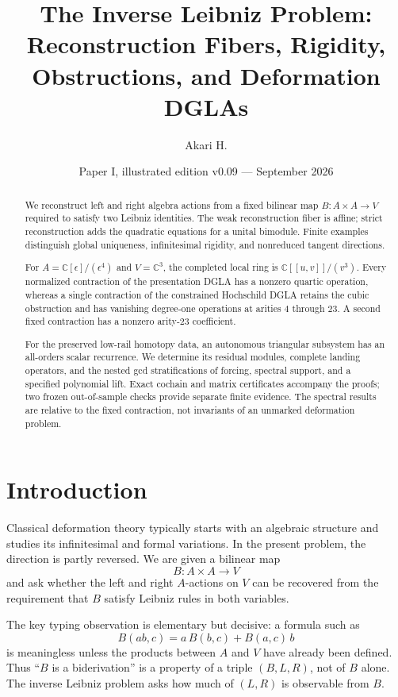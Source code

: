 \documentclass[11pt]{amsart}
\title[The Inverse Leibniz Problem]{The Inverse Leibniz Problem:\\Reconstruction Fibers, Rigidity, Obstructions, and Deformation DGLAs}
\author{Akari H.}
\date{Paper I, illustrated edition v0.09 --- September 2026}
\newcommand{\C}{\mathbb C}
\begin{document}
\begin{abstract}
We reconstruct left and right algebra actions from a fixed bilinear map
$B:A\times A\to V$ required to satisfy two Leibniz identities.
The weak reconstruction fiber is affine; strict reconstruction adds the
quadratic equations for a unital bimodule. Finite examples distinguish
global uniqueness, infinitesimal rigidity, and nonreduced tangent directions.

For $A=\C[\epsilon]/(\epsilon^4)$ and $V=\C^3$, the completed local ring is
$\C[[u,v]]/(v^3)$. Every normalized contraction of the presentation DGLA
has a nonzero quartic operation, whereas a single contraction of the
constrained Hochschild DGLA retains the cubic obstruction and has
vanishing degree-one operations at arities $4$ through $23$.
A second fixed contraction has a nonzero arity-$23$ coefficient.

For the preserved low-rail homotopy data, an autonomous triangular subsystem
has an all-orders scalar recurrence. We determine its residual modules,
complete landing operators, and the nested gcd stratifications of forcing,
spectral support, and a specified polynomial lift.
Exact cochain and matrix certificates accompany the proofs; two frozen
out-of-sample checks provide separate finite evidence.
The spectral results are relative to the fixed contraction, not invariants
of an unmarked deformation problem.
\end{abstract}

\maketitle
\clearpage
\tableofcontents
\clearpage

\section{Introduction}

Classical deformation theory typically starts with an algebraic structure and studies its infinitesimal and formal variations.  In the present problem, the direction is partly reversed.  We are given a bilinear map
\[
B:A\times A\longrightarrow V
\]
and ask whether the left and right $A$-actions on $V$ can be recovered from the requirement that $B$ satisfy Leibniz rules in both variables.

The key typing observation is elementary but decisive: a formula such as
\[
B(ab,c)=a\,B(b,c)+B(a,c)\,b
\]
is meaningless unless the products between $A$ and $V$ have already been defined.  Thus ``$B$ is a biderivation'' is a property of a triple $(B,L,R)$, not of $B$ alone.  The inverse Leibniz problem asks how much of $(L,R)$ is observable from $B$.
\end{document}
